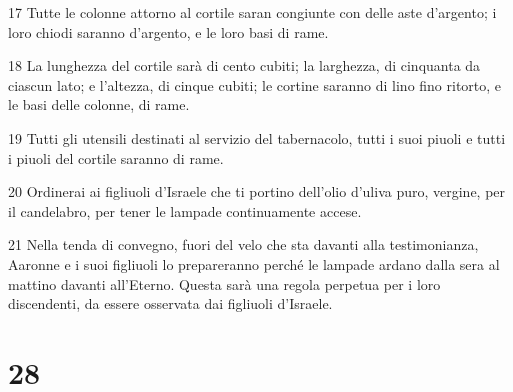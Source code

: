 \par 17 Tutte le colonne attorno al cortile saran congiunte con delle aste d'argento; i loro chiodi saranno d'argento, e le loro basi di rame.
\par 18 La lunghezza del cortile sarà di cento cubiti; la larghezza, di cinquanta da ciascun lato; e l'altezza, di cinque cubiti; le cortine saranno di lino fino ritorto, e le basi delle colonne, di rame.
\par 19 Tutti gli utensili destinati al servizio del tabernacolo, tutti i suoi piuoli e tutti i piuoli del cortile saranno di rame.
\par 20 Ordinerai ai figliuoli d'Israele che ti portino dell'olio d'uliva puro, vergine, per il candelabro, per tener le lampade continuamente accese.
\par 21 Nella tenda di convegno, fuori del velo che sta davanti alla testimonianza, Aaronne e i suoi figliuoli lo prepareranno perché le lampade ardano dalla sera al mattino davanti all'Eterno. Questa sarà una regola perpetua per i loro discendenti, da essere osservata dai figliuoli d'Israele.

\chapter{28}

